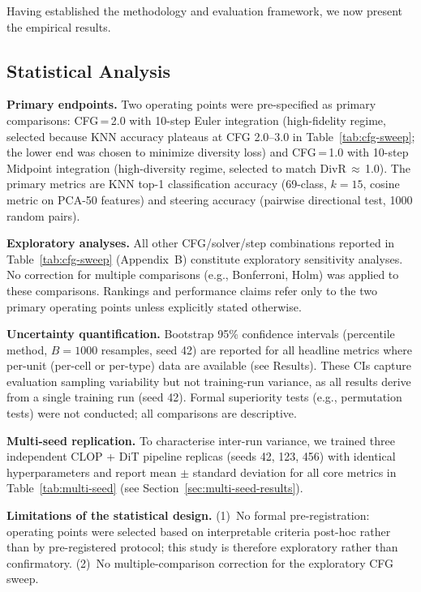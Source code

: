 \documentclass[preprint,12pt]{elsarticle}
\begin{document}
Having established the methodology and evaluation framework, we now present the empirical results.

\subsection{Statistical Analysis}\label{sec:stats}

\textbf{Primary endpoints.} Two operating points were pre-specified as primary comparisons: CFG\,=\,2.0 with 10-step Euler integration (high-fidelity regime, selected because KNN accuracy plateaus at CFG 2.0--3.0 in Table~\ref{tab:cfg-sweep}; the lower end was chosen to minimize diversity loss) and CFG\,=\,1.0 with 10-step Midpoint integration (high-diversity regime, selected to match DivR\,$\approx$\,1.0). The primary metrics are KNN top-1 classification accuracy (69-class, $k{=}15$, cosine metric on PCA-50 features) and steering accuracy (pairwise directional test, 1000 random pairs).

\textbf{Exploratory analyses.} All other CFG/solver/step combinations reported in Table~\ref{tab:cfg-sweep} (Appendix~B) constitute exploratory sensitivity analyses. No correction for multiple comparisons (e.g., Bonferroni, Holm) was applied to these comparisons. Rankings and performance claims refer only to the two primary operating points unless explicitly stated otherwise.

\textbf{Uncertainty quantification.} Bootstrap 95\% confidence intervals (percentile method, $B{=}1000$ resamples, seed 42) are reported for all headline metrics where per-unit (per-cell or per-type) data are available (see Results). These CIs capture evaluation sampling variability but not training-run variance, as all results derive from a single training run (seed 42). Formal superiority tests (e.g., permutation tests) were not conducted; all comparisons are descriptive.

\textbf{Multi-seed replication.} To characterise inter-run variance, we trained three independent CLOP + DiT pipeline replicas (seeds 42, 123, 456) with identical hyperparameters and report mean $\pm$ standard deviation for all core metrics in Table~\ref{tab:multi-seed} (see Section~\ref{sec:multi-seed-results}).

\textbf{Limitations of the statistical design.} (1)~No formal pre-registration: operating points were selected based on interpretable criteria post-hoc rather than by pre-registered protocol; this study is therefore exploratory rather than confirmatory. (2)~No multiple-comparison correction for the exploratory CFG sweep.
\end{document}
